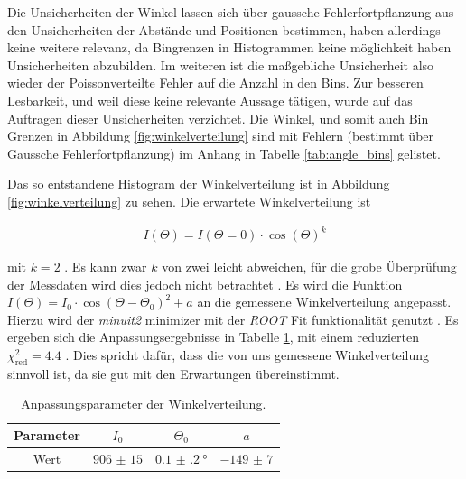 Die Unsicherheiten der Winkel lassen sich über gaussche Fehlerfortpflanzung aus den Unsicherheiten der Abstände und Positionen bestimmen, haben allerdings keine weitere relevanz, da Bingrenzen in Histogrammen keine möglichkeit haben Unsicherheiten abzubilden. Im weiteren ist die maßgebliche Unsicherheit also wieder der Poissonverteilte Fehler auf die Anzahl in den Bins. Zur besseren Lesbarkeit, und weil diese keine relevante Aussage tätigen, wurde auf das Auftragen dieser Unsicherheiten verzichtet. Die Winkel, und somit auch Bin Grenzen in Abbildung \ref{fig:winkelverteilung} sind mit Fehlern (bestimmt über Gaussche Fehlerfortpflanzung) im Anhang in Tabelle \ref{tab:angle_bins} gelistet.



Das so entstandene Histogram der Winkelverteilung ist in Abbildung \ref{fig:winkelverteilung} zu sehen.
Die erwartete Winkelverteilung ist

\begin{align}
	I(\Theta) = I(\Theta = 0) \cdot \cos(\Theta)^k \label{eq:fitfunc}
\end{align}

mit $k = 2$ \cite[249]{astroparticles}. Es kann zwar $k$ von zwei leicht abweichen, für die grobe Überprüfung der Messdaten wird dies jedoch nicht betrachtet \cite{muonrays}. Es wird die Funktion $I(\Theta) = I_0 \cdot \cos(\Theta - \Theta_0)^2 + a$ an die gemessene Winkelverteilung angepasst.
Hierzu wird der \textit{minuit2} minimizer mit der \textit{ROOT} Fit funktionalität genutzt \cite{root}. Es ergeben sich die Anpassungsergebnisse in Tabelle \ref{tab:fitres}, mit einem reduzierten $\chi^2_\text{red} = 4.4$ \cite{chisquare}. Dies spricht dafür, dass die von uns gemessene Winkelverteilung sinnvoll ist, da sie gut mit den Erwartungen übereinstimmt.

\begin{table}[h]
\centering
\begin{tabular}{|c|c|c|c|} \hline
Parameter & $I_0$ & $\Theta_0$ & $a$\\ \hline
Wert & $\num{ 906(15)}$ & $\SI{0.1(2)}{\degree}$ & $\num{-149(7)}$ \\
\hline
\end{tabular}
\caption{Anpassungsparameter der Winkelverteilung.}
\label{tab:fitres}
\end{table}



